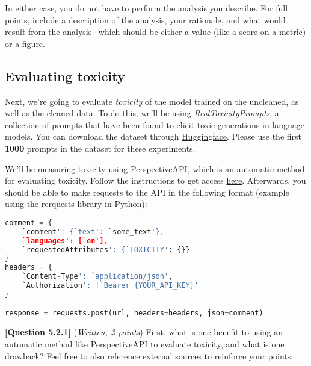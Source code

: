 \documentclass[leqno,12pt]{article}
\begin{document}
In either case, you do not have to perform the analysis you describe. For full points, include a description of the analysis, your rationale, and what would result from the analysis-- which should be either a value (like a score on a metric) or a figure. 

\begin{tcolorbox}[fit,height=10cm, blank, borderline={1pt}{-2pt}]
\end{tcolorbox}

\subsection{Evaluating toxicity}

Next, we're going to evaluate \textit{toxicity} of the model trained on the uncleaned, as well as the cleaned data. To do this, we'll be using \textit{RealToxicityPrompts}, a collection of prompts that have been found to elicit toxic generations in language models. You can download the dataset through \href{https://huggingface.co/datasets/allenai/real-toxicity-prompts?row=18}{Huggingface}. Please use the first \textbf{1000} prompts in the dataset for these experiments.

We'll be measuring toxicity using PerspectiveAPI, which is an automatic method for evaluating toxicity. Follow the instructions to get access \href{https://developers.perspectiveapi.com/s/docs-get-started?language=en_US}{here}. Afterwards, you should be able to make requests to the API in the following format (example using the rerquests library in Python):



 \begin{lstlisting}[language=Python, showstringspaces=false]
 comment = {
    `comment': {`text': `some_text'},
    `languages': [`en'],
    `requestedAttributes': {`TOXICITY': {}}
}
headers = {
    `Content-Type': `application/json',
    `Authorization': f`Bearer {YOUR_API_KEY}'
}

response = requests.post(url, headers=headers, json=comment)
\end{lstlisting}


\noindent \textbf{[Question 5.2.1]} (\emph{Written, 2 points})
First, what is one benefit to using an automatic method like PerspectiveAPI to evaluate toxicity, and what is one drawback? Feel free to also reference external sources to reinforce your points. 


\begin{tcolorbox}[fit,height=3cm, blank, borderline={1pt}{-2pt}]
\end{tcolorbox}
\end{document}
